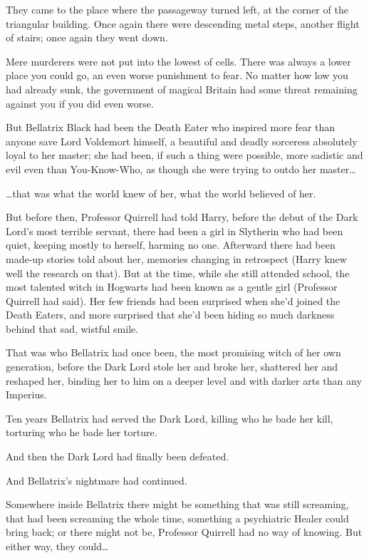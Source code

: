 They came to the place where the passageway turned left, at the corner of the
triangular building. Once again there were descending metal steps, another
flight of stairs; once again they went down.

Mere murderers were not put into the lowest of cells. There was always a lower
place you could go, an even worse punishment to fear. No matter how low you had
already sunk, the government of magical Britain had some threat remaining
against you if you did even worse.

But Bellatrix Black had been the Death Eater who inspired more fear than anyone
save Lord Voldemort himself, a beautiful and deadly sorceress absolutely loyal
to her master; she had been, if such a thing were possible, more sadistic and
evil even than You-Know-Who, as though she were trying to outdo her
master{\ldots}

{\ldots}that was what the world knew of her, what the world believed of her.

But before then, Professor Quirrell had told Harry, before the debut of the
Dark Lord's most terrible servant, there had been a girl in Slytherin who had
been quiet, keeping mostly to herself, harming no one. Afterward there had been
made-up stories told about her, memories changing in retrospect (Harry knew
well the research on that). But at the time, while she still attended school,
the most talented witch in Hogwarts had been known as a gentle girl (Professor
Quirrell had said). Her few friends had been surprised when she'd joined the
Death Eaters, and more surprised that she'd been hiding so much darkness behind
that sad, wistful smile.

That was who Bellatrix had once been, the most promising witch of her own
generation, before the Dark Lord stole her and broke her, shattered her and
reshaped her, binding her to him on a deeper level and with darker arts than
any Imperius.

Ten years Bellatrix had served the Dark Lord, killing who he bade her kill,
torturing who he bade her torture.

And then the Dark Lord had finally been defeated.

And Bellatrix's nightmare had continued.

Somewhere inside Bellatrix there might be something that was still screaming,
that had been screaming the whole time, something a psychiatric Healer could
bring back; or there might not be, Professor Quirrell had no way of knowing.
But either way, they could{\ldots}

